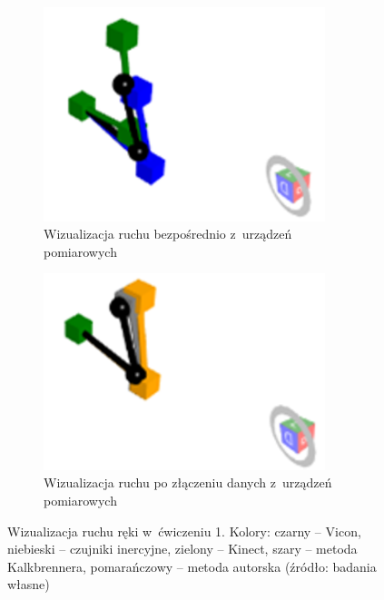 \begin{figure}[!htb]
	\captionsetup{singlelinecheck=off}
	\centering
	\begin{subfigure}[b]{0.48\textwidth}
		\centering
		\includegraphics[width=0.9\textwidth]{images/100/raw.png}	
		\caption{Wizualizacja ruchu bezpośrednio z~urządzeń pomiarowych}
		\label{fig:experiments:first:raw}
	\end{subfigure}
	\hfill																														
	\begin{subfigure}[b]{0.48\textwidth}
		\centering
		\includegraphics[width=0.9\textwidth]{images/100/Fused.png}		
		\caption{Wizualizacja ruchu po złączeniu danych z~urządzeń pomiarowych}
		\label{fig:experiments:first:fused}	
	\end{subfigure}																														
	\caption[Wizualizacja ruchu ręki w~ćwiczeniu 1]{Wizualizacja ruchu ręki w~ćwiczeniu 1.  Kolory: czarny -- Vicon, niebieski -- czujniki inercyjne, zielony -- Kinect, szary -- metoda Kalkbrennera, pomarańczowy -- metoda autorska (źródło: badania własne)}	
	\label{fig:experiments:first}
\end{figure}
														

